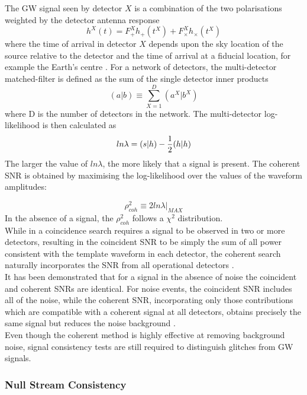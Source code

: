 \documentclass[binding=0.6cm, LaM]{sapthesis}
\begin{document}
	The GW signal seen by detector $X$ is a combination of 
	the two polarisations weighted by the detector antenna 
	response
		\begin{equation}
			h^X(t) = F_{+}^X h_{+}(t^X) + F_{\times}^X h_{\times}(t^X) 
		\end{equation}
	where the time of arrival in detector $X$ depends upon the sky location 
	of the source relative to the detector and the time of arrival at a fiducial location, 
	for example the Earth’s centre \cite{45}. 
	For a network of detectors, the multi-detector matched-filter
	is defined as the sum of the single detector inner products
		\begin{equation}
			(a|b) \equiv \sum^D_{X=1} (a^X|b^X)
		\end{equation}
	where D is the number of detectors in the network. The multi-detector log-likelihood is then calculated as
		\begin{equation}
			ln \lambda = (s|h) - {1 \over 2} (h|h)
		\end{equation}
	The larger the value of $ln \lambda$, the more likely that a signal is present.
	The coherent SNR is obtained by maximising the log-likelihood 
	over the values of the waveform amplitudes:

		\begin{equation}
			\rho^2 _{coh}\equiv 2 ln \lambda |_{MAX}
		\end{equation}
	In the absence of a signal, the $\rho^2_{coh}$ follows a $\chi^2$ distribution. \\
        While in a coincidence search requires a signal to be observed in two or more detectors, 
	resulting in the coincident SNR to be simply the sum of all power consistent with the template waveform in each detector,
	the coherent search naturally incorporates the SNR from all operational detectors \cite{45, 46}. \\
	It has been demonstrated that for a signal in the absence of noise the coincident and coherent SNRs are identical. 
	For noise events, the coincident SNR includes all of the noise, 
	while the coherent SNR, incorporating only those contributions which are compatible 
	with a coherent signal at all detectors, obtains precisely the same signal but reduces the noise background \cite{45}. \\
	Even though the coherent method is highly effective at removing background noise,  
	signal consistency tests are still required to distinguish glitches from GW signals. 

\subsubsection{Null Stream Consistency}
\end{document}
